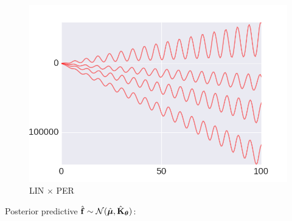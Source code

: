     \begin{subfigure}[b]{0.3\textwidth}
        \includegraphics[width=\textwidth]{figs/composition/composition_demo_LINxPER_prior.png}
        \caption{LIN $\times$ PER}
    \end{subfigure} \vspace{4mm} 

Posterior predictive $\hat{\mathbf{f}} \sim \mathcal{N}(\hat{\bm{\mu}},\hat{\mathbf{K}}_{\bm{\theta}})$:

